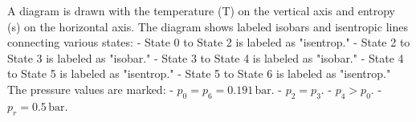 A diagram is drawn with the temperature (T) on the vertical axis and entropy (s) on the horizontal axis. The diagram shows labeled isobars and isentropic lines connecting various states:  
- State 0 to State 2 is labeled as "isentrop."  
- State 2 to State 3 is labeled as "isobar."  
- State 3 to State 4 is labeled as "isobar."  
- State 4 to State 5 is labeled as "isentrop."  
- State 5 to State 6 is labeled as "isentrop."  
The pressure values are marked:  
- \( p_0 = p_6 = 0.191 \, \text{bar} \).  
- \( p_2 = p_3 \).  
- \( p_4 > p_0 \).  
- \( p_r = 0.5 \, \text{bar} \).